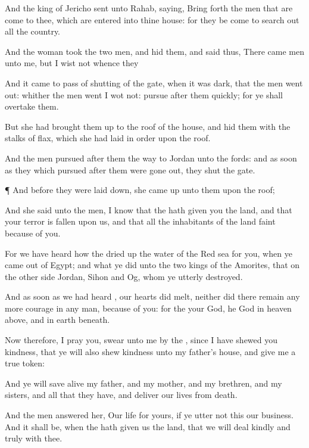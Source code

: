 {And the
king of
Jericho
sent unto
Rahab,
saying, Bring
forth the
men that are
come to thee, which are
entered into thine
house: for they be
come to search
out all the
country.

And the
woman
took the
two
men, and
hid them, and
said thus, There
came
men unto me, but I
wist not
whence they
{}

And it came to pass
{} of
shutting of the
gate, when it was
dark, that the
men went
out: whither the
men
went I
wot not:
pursue
after them
quickly; for ye shall
overtake them.

But she had brought them
up to the
roof of the house, and
hid them with the
stalks of
flax, which she had laid in
order upon the
roof.

And the
men
pursued
after them the
way to
Jordan unto the
fords: and as soon as they which
pursued
after them were gone
out, they
shut the
gate.


\par }{\PP {}¶ And before they were laid
down, she came
up unto them upon the
roof;

And she
said unto the
men, I
know that the
{} hath
given you the
land, and that your
terror is
fallen upon us, and that all the
inhabitants of the
land
faint
because of you.

For we have
heard how the
{} dried
up the
water of the
Red
sea for
you, when ye came
out of
Egypt; and what ye
did unto the
two
kings of the
Amorites, that
{} on the other
side
Jordan,
Sihon and
Og, whom ye utterly
destroyed.

And as soon as we had
heard
{}, our
hearts did
melt, neither did there
remain any more
courage in any
man,
because of you: for the
{} your
God, he
{}
God in
heaven
above, and in
earth beneath.

Now therefore, I pray you,
swear unto me by the
{},
since I have
shewed you
kindness, that ye will also
shew
kindness unto my
father’s
house, and
give me a
true
token:

And
{} ye will save
alive my
father, and my
mother, and my
brethren, and my
sisters, and all that they have, and
deliver our
lives from
death.

And the
men
answered her, Our
life for
yours, if ye
utter not this our
business. And it shall be, when the
{} hath
given us the
land, that we will
deal
kindly and
truly with thee.

}
